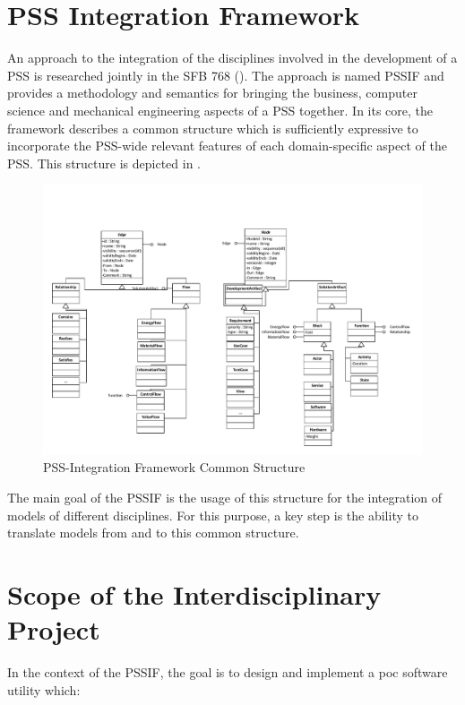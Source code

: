 \section*{PSS Integration Framework}

An approach to the integration of the disciplines involved in the development of a \gls{PSS} is researched jointly in the SFB 768 (\cite{ref:sfb}). The approach is named \gls{PSSIF} \cite{ref:paper} and provides a methodology and semantics for bringing the business, computer science and mechanical engineering aspects of a \gls{PSS} together. In its core, the framework describes a common structure which is sufficiently expressive to incorporate the \gls{PSS}-wide relevant features of each domain-specific aspect of the PSS. This structure is depicted in .

\begin{figure}
\centering
\includegraphics[width=\textwidth]{figures/PSSIF.pdf}
\caption{PSS-Integration Framework Common Structure}
\label{fig:canonic}
\end{figure}

The main goal of the \gls{PSSIF} is the usage of this structure for the integration of models of different disciplines. For this purpose, a key step is the ability to translate models from and to this common structure.

\section*{Scope of the Interdisciplinary Project}

In the context of the \gls{PSSIF}, the goal is to design and implement a \gls{poc} software utility which:

